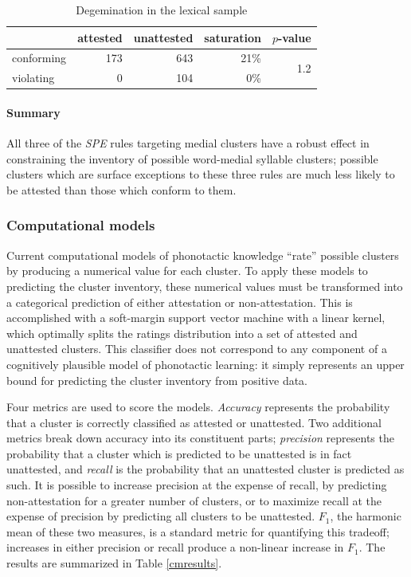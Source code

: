 \begin{table}[ht]
\centering
\begin{tabular}{l rrrr}
\toprule
           & attested & unattested & saturation & $p$-value \\
\midrule
conforming & 173      & 643        & 21\%       & \multirow{2}{*}{1.2\e{-10}} \\
violating  & 0        & 104        & 0\%        \\
\bottomrule
\end{tabular}
\caption{Degemination in the lexical sample}
\label{degemtab}
\end{table}

\paragraph{Summary} All three of the \emph{SPE} rules targeting medial clusters have a robust effect in constraining the inventory of possible word-medial syllable clusters; possible clusters which are surface exceptions to these three rules are much less likely to be attested than those which conform to them. 

\subsubsection{Computational models}

Current computational models of phonotactic knowledge ``rate'' possible clusters by producing a numerical value for each cluster. 
To apply these models to predicting the cluster inventory, these numerical values must be transformed into a categorical prediction of either attestation or non-attestation.
This is accomplished with a soft-margin support vector machine \citep{Cortes1995} with a linear kernel, which optimally splits the ratings distribution into a set of attested and unattested clusters.
This classifier does not correspond to any component of a cognitively plausible model of phonotactic learning: it simply represents an upper bound for predicting the cluster inventory from positive data.

Four metrics are used to score the models. 
\emph{Accuracy} represents the probability that a cluster is correctly classified as attested or unattested.
Two additional metrics break down accuracy into its constituent parts;
\emph{precision} represents the probability that a cluster which is predicted to be unattested is in fact unattested, and \emph{recall} is the probability that an unattested cluster is predicted as such.
It is possible to increase precision at the expense of recall, by predicting non-attestation for a greater number of clusters, or to maximize recall at the expense of precision by predicting all clusters to be unattested. 
$F_1$, the harmonic mean of these two measures, is a standard metric for quantifying this tradeoff; increases in either precision or recall produce a  non-linear increase in $F_1$. The results are summarized in Table \ref{cmresults}.


